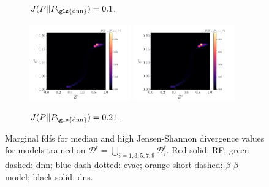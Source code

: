 \documentclass[review]{elsarticle}
\begin{document}
\begin{figure}[!tbp]
\begin{subfigure}[t]{\textwidth}
    \caption{$J(P||P_{\text{\gls{dnn}}})=0.1$.}\label{fig:}%
  \end{subfigure}\hfill%
  \begin{subfigure}[t]{\textwidth}%
    \includegraphics[page=3,width=0.48\textwidth, trim=0.2cm 0cm 1cm 1cm, clip=true]{./figs/pdfs_182976.pdf}\hfill%
    \includegraphics[page=4,width=0.48\textwidth, trim=0.2cm 0cm 1cm 1cm, clip=true]{./figs/pdfs_182976.pdf}%
    \caption{$J(P||P_{\text{\gls{dnn}}})=0.21$.}\label{fig:pdfs_skip_3}%
  \end{subfigure}%
  \caption{Marginal \glspl{fdf} for median and high Jensen-Shannon divergence values for models trained on $\mathcal{D}^t = \bigcup\limits_{i=1, 3, 5, 7, 9} \mathcal{D}_i^t$. Red solid: RF; green dashed: \gls{dnn}; blue dash-dotted: \gls{cvae}; orange short dashed: $\beta$-$\beta$ model; black solid: \gls{dns}.}\label{fig:pdfs_skip}%
\end{figure}%
\end{document}
